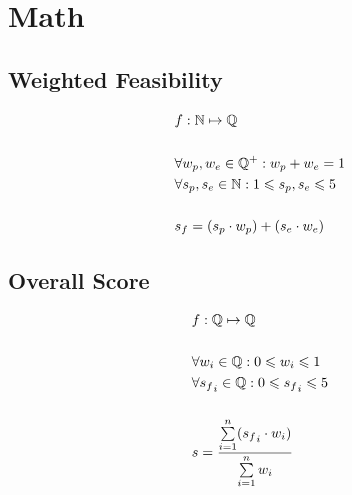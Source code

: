 \chapter{Math}\label{ax:math}

\section{Weighted Feasibility}\label{ax:math:feasibility}

\begin{align*}
    &f: \mathbb{N} \mapsto \mathbb{Q} \\
    \\
    &\forall w_p,w_e \in \mathbb{Q}^+: w_p + w_e = 1 \\
    &\forall s_p,s_e \in \mathbb{N}: 1 \leqslant s_p,s_e \leqslant 5 \\
    \\
    &s_f = (s_p \cdot w_p) + (s_e \cdot w_e) \\
\end{align*}

\section{Overall Score}\label{ax:math:mean}

\begin{align*}
    &f: \mathbb{Q} \mapsto \mathbb{Q} \\
    \\
    &\forall w_i \in \mathbb{Q}:0 \leqslant w_i \leqslant 1 \\
    &\forall {s_f}_i \in \mathbb{Q}:0 \leqslant {s_f}_i \leqslant 5 \\
    \\
    &s = \frac{\sum\limits_{i=1}^{n}({s_f}_i \cdot w_i)}{\sum\limits_{i=1}^{n}w_i} \\
\end{align*}
